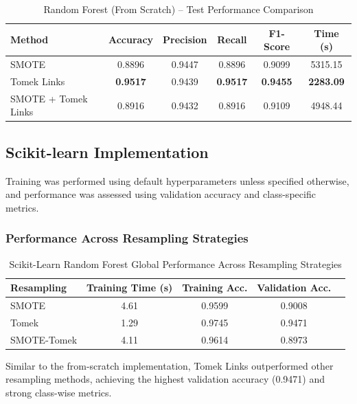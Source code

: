 \begin{table}[H]
\centering
\caption{Random Forest (From Scratch) -- Test Performance Comparison}
\label{tab:rf_scratch_comparison}
\begin{tabular}{lccccc}
\toprule
\textbf{Method} & \textbf{Accuracy} & \textbf{Precision} & \textbf{Recall} & \textbf{F1-Score} & \textbf{Time (s)} \\
\midrule
SMOTE & 0.8896 & 0.9447 & 0.8896 & 0.9099 & 5315.15 \\
Tomek Links & \textbf{0.9517} & 0.9439 & \textbf{0.9517} & \textbf{0.9455} & \textbf{2283.09} \\
SMOTE + Tomek Links & 0.8916 & 0.9432 & 0.8916 & 0.9109 & 4948.44 \\
\bottomrule
\end{tabular}
\end{table}








\subsection{Scikit-learn Implementation}
Training was performed using default hyperparameters unless specified otherwise, and performance was assessed using validation accuracy and class-specific metrics.

\subsubsection{Performance Across Resampling Strategies}

\begin{table}[H]
\centering
\caption{Scikit-Learn Random Forest Global Performance Across Resampling Strategies}
\begin{tabular}{|l|c|c|c|c|}
\hline
\textbf{Resampling} & \textbf{Training Time (s)} & \textbf{Training Acc.} & \textbf{Validation Acc.} \\ \hline
SMOTE & 4.61 & 0.9599 & 0.9008 \\ \hline
Tomek & 1.29 & 0.9745 & 0.9471 \\ \hline
SMOTE-Tomek & 4.11 & 0.9614 & 0.8973 \\ \hline
\end{tabular}
\end{table}


Similar to the from-scratch implementation, Tomek Links outperformed other resampling methods, achieving the highest validation accuracy (0.9471) and strong class-wise metrics.
